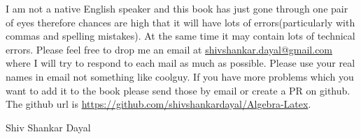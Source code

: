 I am not a native English speaker and this book has just gone through one pair
of eyes therefore chances are high that it will have lots of errors(particularly with commas and spelling mistakes). At the
same time it may contain lots of technical errors. Please feel free to drop me
an email at
\href{mailto:shivshankar.dayal@gmail.com}{shivshankar.dayal@gmail.com} where I
will try to respond to each mail as
much as possible. Please use your real names in email not something like
coolguy. If you have more problems which you want to add it to the book please send
those by email or create a PR on github. The github url is \url{https://github.com/shivshankardayal/Algebra-Latex}.
\begin{flushright}
Shiv Shankar Dayal
\end{flushright}
